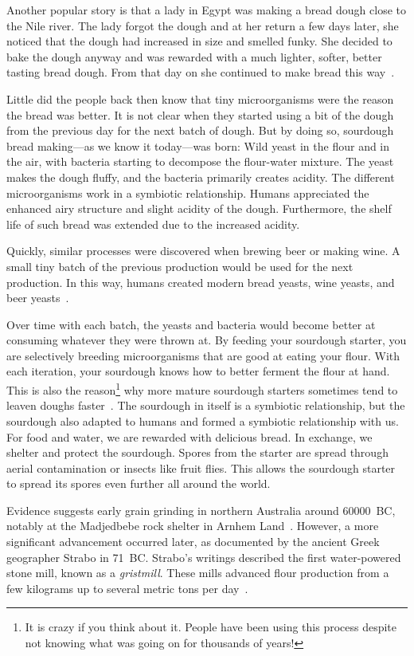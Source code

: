 Another popular story is that a lady in Egypt was making
a bread dough close to the Nile river. The lady forgot the
dough and at her return a few days later, she noticed that the dough had
increased in size and smelled funky. She decided to bake
the dough anyway and was rewarded with a much
lighter, softer, better tasting bread dough. From that day
on she continued to make bread this way~\cite{egyptian+bread}.

Little did the people back then know that tiny microorganisms
were the reason the bread was better. It is not clear when
they started using a bit of the dough from the previous
day for the next batch of dough. But by doing so, sourdough
bread making---as we know it today---was born: Wild yeast
in the flour and in the air, with bacteria
starting to decompose the flour-water mixture.
The yeast makes the dough fluffy,
and the bacteria primarily creates acidity. The different
microorganisms work in a symbiotic relationship. Humans
appreciated the enhanced airy structure and slight acidity
of the dough. Furthermore, the shelf life of such bread
was extended due to the increased acidity.

Quickly, similar processes were discovered when brewing beer
or making wine. A small tiny batch of the previous production
would be used for the next production. In this way, humans created
modern bread yeasts, wine yeasts, and beer yeasts~\cite{egypt+beer}.

Over time with each batch, the yeasts and bacteria
would become better at consuming whatever they were thrown at.
By feeding your sourdough starter, you are selectively breeding
microorganisms that are good at eating your flour. With
each iteration, your sourdough knows how to better ferment the flour
at hand. This is also the reason\footnote{It is crazy if you think about it.
People have been using this process despite not knowing what was going on for
thousands of years!} why more mature sourdough starters sometimes tend to
leaven doughs faster~\cite{review+of+sourdough+starters}.  The sourdough in
itself is a symbiotic relationship, but the sourdough
also adapted to humans and formed a symbiotic relationship with us.
For food and water, we are rewarded with delicious bread. In exchange,
we shelter and protect the sourdough. Spores from the starter
are spread through aerial contamination or insects like fruit flies.
This allows the sourdough starter to spread its spores even
further all around the world.

Evidence suggests early grain grinding in northern Australia around
\num{60000}~BC, notably at the Madjedbebe rock shelter in Arnhem
Land~\cite{aboriginal+grinding+stones}.  However, a more significant
advancement occurred later, as documented by the ancient Greek geographer
Strabo in \num{71}~BC\@.  Strabo's writings described the first water-powered
stone mill, known as a \emph{gristmill}. These mills advanced flour production
from a few kilograms up to several metric tons per day~\cite{history+mills}.

